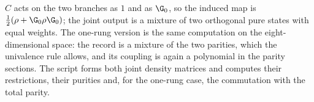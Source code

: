 $C$ acts on the two branches as $1$ and as $\G_{0}$, so the induced map is $\tfrac12(\rho + \G_{0}\rho\G_{0})$; the joint output is a mixture of two orthogonal pure states with equal weights. The one-rung version is the same computation on the eight-dimensional space: the record is a mixture of the two parities, which the univalence rule allows, and its coupling is again a polynomial in the parity sections. The script forms both joint density matrices and computes their restrictions, their purities and, for the one-rung case, the commutation with the total parity.
